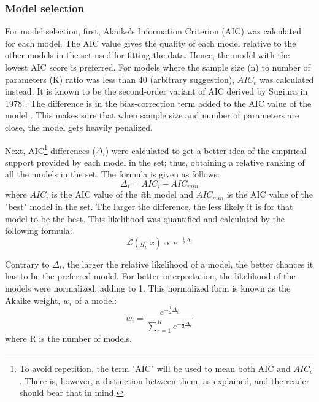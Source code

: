 \documentclass[11pt]{article}
\begin{document}
\begin{linenumbers}
	\subsubsection{Model selection}
	\par For model selection, first, Akaike's Information Criterion (AIC) \cite{Akaike1973} was calculated for each model. The AIC value gives the quality of each model relative to the other models in the set used for fitting the data. Hence, the model with the lowest AIC score is preferred. For models where the sample size (n) to number of parameters (K) ratio was less than 40 (arbitrary suggestion), $AIC_c$ was calculated instead. It is known to be the second-order variant of AIC derived by Sugiura  in 1978 \cite{Sugiura1978}. The difference is in the bias-correction term added to the AIC value of the model \cite{Anderson2002}. This makes sure that when sample size and number of parameters are close, the model gets heavily penalized.
	\par Next, AIC\footnote[1]{To avoid repetition, the term "AIC" will be used to mean both AIC and $AIC_c$. There is, however, a distinction between them, as explained, and the reader should bear that in mind.} differences ($\Delta_i$) were calculated to get a better idea of the empirical support provided by each model in the set; thus, obtaining a relative ranking of all the models in the set. The formula is given as follows:
	\begin{equation}
		\Delta_i = AIC_i - AIC_{min}
	\end{equation}
	where $AIC_i$ is the AIC value of the \emph{i}th model and $AIC_{min}$ is the AIC value of the "best" model in the set. The larger the difference, the less likely it is for that model to be the best. This likelihood was quantified and calculated by the following formula:
	\begin{equation}
		\mathcal{L}(g_i|x) \propto e^{-\frac{1}{2}\Delta_i}
	\end{equation}
	
	\par Contrary to $\Delta_i$, the larger the relative likelihood of a model, the better chances it has to be the preferred model.
	For better interpretation, the likelihood of the models were normalized, adding to 1. This normalized form is known as the Akaike weight, $w_i$ of a model:
	\begin{equation}
		w_i = \frac{e^{-\frac{1}{2}\Delta_i}}{\displaystyle\sum_{r=1}^{R} e^{-\frac{1}{2}\Delta_r}}
	\end{equation}
	where R is the number of models.
	

\end{linenumbers}
\end{document}

